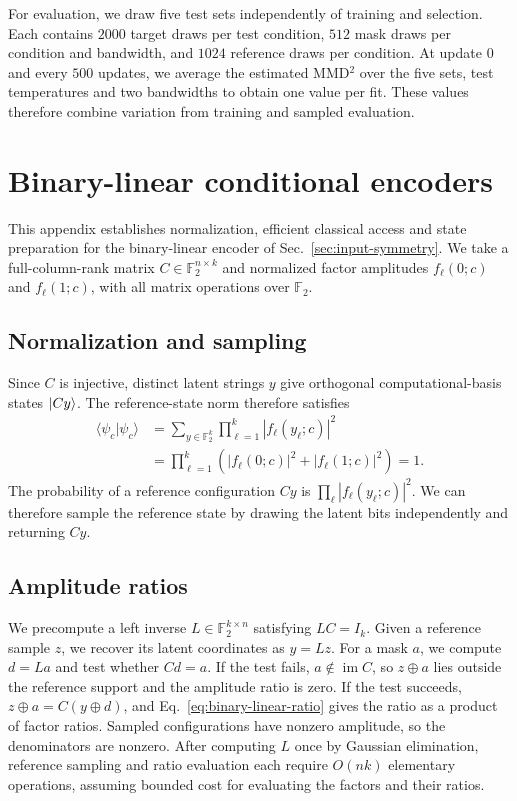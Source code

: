 \documentclass[pra,aps,10pt,twocolumn,floatfix,superscriptaddress, notitlepage,longbibliography]{revtex4-2}
\begin{document}
For evaluation, we draw five test sets independently of training and selection. Each contains $2000$ target draws per test condition, $512$ mask draws per condition and bandwidth, and $1024$ reference draws per condition. At update $0$ and every $500$ updates, we average the estimated MMD$^{2}$ over the five sets, test temperatures and two bandwidths to obtain one value per fit. These values therefore combine variation from training and sampled evaluation.

\clearpage
\section{Binary-linear conditional encoders}
\label{app:binary-linear-encoders}

This appendix establishes normalization, efficient classical access and state preparation for the binary-linear encoder of Sec.~\ref{sec:input-symmetry}. We take a full-column-rank matrix $C\in\mathbb F_2^{n\times k}$ and normalized factor amplitudes $f_\ell(0;c)$ and $f_\ell(1;c)$, with all matrix operations over $\mathbb F_2$.

\subsection{Normalization and sampling}

Since $C$ is injective, distinct latent strings $y$ give orthogonal computational-basis states $\ket{Cy}$. The reference-state norm therefore satisfies
\begin{equation}
\begin{aligned}
 \langle\psi_c|\psi_c\rangle
 &=\sum_{y\in\mathbb F_2^k}
   \prod_{\ell=1}^{k}|f_\ell(y_\ell;c)|^2\\
 &=\prod_{\ell=1}^{k}
   \left(|f_\ell(0;c)|^2+|f_\ell(1;c)|^2\right)=1.
\end{aligned}
\end{equation}
The probability of a reference configuration $Cy$ is $\prod_\ell|f_\ell(y_\ell;c)|^2$. We can therefore sample the reference state by drawing the latent bits independently and returning $Cy$.

\subsection{Amplitude ratios}

We precompute a left inverse $L\in\mathbb F_2^{k\times n}$ satisfying $LC=I_k$. Given a reference sample $z$, we recover its latent coordinates as $y=Lz$. For a mask $a$, we compute $d=La$ and test whether $Cd=a$. If the test fails, $a\notin\operatorname{im}C$, so $z\oplus a$ lies outside the reference support and the amplitude ratio is zero. If the test succeeds, $z\oplus a=C(y\oplus d)$, and Eq.~\eqref{eq:binary-linear-ratio} gives the ratio as a product of factor ratios. Sampled configurations have nonzero amplitude, so the denominators are nonzero. After computing $L$ once by Gaussian elimination, reference sampling and ratio evaluation each require $O(nk)$ elementary operations, assuming bounded cost for evaluating the factors and their ratios.
\end{document}
